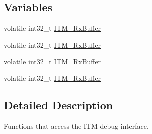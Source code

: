 \subsection*{Variables}
\begin{DoxyCompactItemize}
\item 
volatile int32\-\_\-t \hyperlink{group___c_m_s_i_s__core___debug_functions_ga12e68e55a7badc271b948d6c7230b2a8}{I\-T\-M\-\_\-\-Rx\-Buffer}
\item 
volatile int32\-\_\-t \hyperlink{group___c_m_s_i_s__core___debug_functions_ga12e68e55a7badc271b948d6c7230b2a8}{I\-T\-M\-\_\-\-Rx\-Buffer}
\item 
volatile int32\-\_\-t \hyperlink{group___c_m_s_i_s__core___debug_functions_ga12e68e55a7badc271b948d6c7230b2a8}{I\-T\-M\-\_\-\-Rx\-Buffer}
\item 
volatile int32\-\_\-t \hyperlink{group___c_m_s_i_s__core___debug_functions_ga12e68e55a7badc271b948d6c7230b2a8}{I\-T\-M\-\_\-\-Rx\-Buffer}
\end{DoxyCompactItemize}


\subsection{Detailed Description}
Functions that access the I\-T\-M debug interface. 

